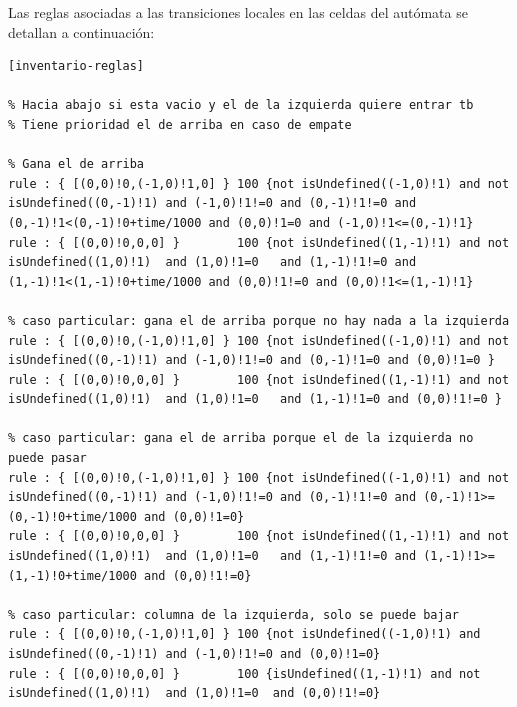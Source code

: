 \documentclass[10pt]{article}
\begin{document}
Las reglas asociadas a las transiciones locales en las celdas del autómata se detallan a continuación:

\begin{minipage}{1\textwidth}
	\centering
	\begin{lstlisting}
[inventario-reglas]

% Hacia abajo si esta vacio y el de la izquierda quiere entrar tb
% Tiene prioridad el de arriba en caso de empate

% Gana el de arriba
rule : { [(0,0)!0,(-1,0)!1,0] } 100 {not isUndefined((-1,0)!1) and not isUndefined((0,-1)!1) and (-1,0)!1!=0 and (0,-1)!1!=0 and (0,-1)!1<(0,-1)!0+time/1000 and (0,0)!1=0 and (-1,0)!1<=(0,-1)!1}
rule : { [(0,0)!0,0,0] }        100 {not isUndefined((1,-1)!1) and not isUndefined((1,0)!1)  and (1,0)!1=0   and (1,-1)!1!=0 and (1,-1)!1<(1,-1)!0+time/1000 and (0,0)!1!=0 and (0,0)!1<=(1,-1)!1}

% caso particular: gana el de arriba porque no hay nada a la izquierda
rule : { [(0,0)!0,(-1,0)!1,0] } 100 {not isUndefined((-1,0)!1) and not isUndefined((0,-1)!1) and (-1,0)!1!=0 and (0,-1)!1=0 and (0,0)!1=0 }
rule : { [(0,0)!0,0,0] }        100 {not isUndefined((1,-1)!1) and not isUndefined((1,0)!1)  and (1,0)!1=0   and (1,-1)!1=0 and (0,0)!1!=0 }

% caso particular: gana el de arriba porque el de la izquierda no puede pasar
rule : { [(0,0)!0,(-1,0)!1,0] } 100 {not isUndefined((-1,0)!1) and not isUndefined((0,-1)!1) and (-1,0)!1!=0 and (0,-1)!1!=0 and (0,-1)!1>=(0,-1)!0+time/1000 and (0,0)!1=0}
rule : { [(0,0)!0,0,0] }        100 {not isUndefined((1,-1)!1) and not isUndefined((1,0)!1)  and (1,0)!1=0   and (1,-1)!1!=0 and (1,-1)!1>=(1,-1)!0+time/1000 and (0,0)!1!=0}

% caso particular: columna de la izquierda, solo se puede bajar
rule : { [(0,0)!0,(-1,0)!1,0] } 100 {not isUndefined((-1,0)!1) and isUndefined((0,-1)!1) and (-1,0)!1!=0 and (0,0)!1=0}
rule : { [(0,0)!0,0,0] }        100 {isUndefined((1,-1)!1) and not isUndefined((1,0)!1)  and (1,0)!1=0  and (0,0)!1!=0}
	\end{lstlisting}
\end{minipage}
\end{document}
